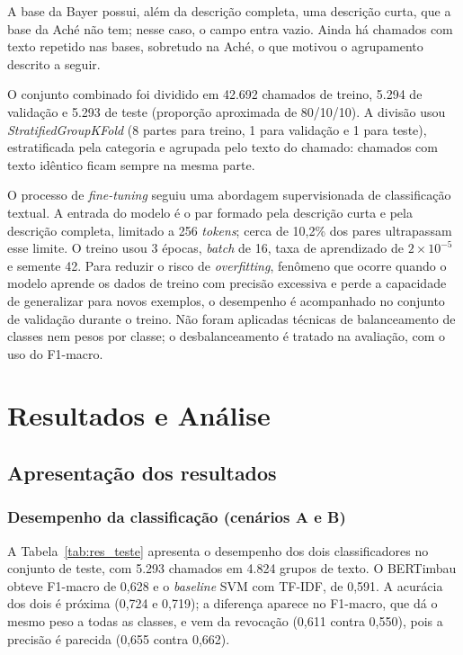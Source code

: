 \documentclass[
    12pt,                %
    openright,           %
    oneside,             %
    a4paper,             %
    english,             %
    brazil               %
]{abntex2}
\begin{document}
A base da Bayer possui, além da descrição completa, uma descrição curta, que a base da Aché não tem; nesse caso, o campo entra vazio. Ainda há chamados com texto repetido nas bases, sobretudo na Aché, o que motivou o agrupamento descrito a seguir.

O conjunto combinado foi dividido em 42.692 chamados de treino, 5.294 de validação e 5.293 de teste (proporção aproximada de 80/10/10). A divisão usou \textit{StratifiedGroupKFold} (8 partes para treino, 1 para validação e 1 para teste), estratificada pela categoria e agrupada pelo texto do chamado: chamados com texto idêntico ficam sempre na mesma parte.

O processo de \textit{fine-tuning} seguiu uma abordagem supervisionada de classificação textual. A entrada do modelo é o par formado pela descrição curta e pela descrição completa, limitado a 256 \textit{tokens}; cerca de 10,2\% dos pares ultrapassam esse limite. O treino usou 3 épocas, \textit{batch} de 16, taxa de aprendizado de $2 \times 10^{-5}$ e semente 42. Para reduzir o risco de \textit{overfitting}, fenômeno que ocorre quando o modelo aprende os dados de treino com precisão excessiva e perde a capacidade de generalizar para novos exemplos, o desempenho é acompanhado no conjunto de validação durante o treino. Não foram aplicadas técnicas de balanceamento de classes nem pesos por classe; o desbalanceamento é tratado na avaliação, com o uso do F1-macro.

\chapter{Resultados e Análise}
\label{cap:resultados}

\section{Apresentação dos resultados}

\subsection{Desempenho da classificação (cenários A e B)}
\label{subsec:res_classificacao}

A Tabela~\ref{tab:res_teste} apresenta o desempenho dos dois classificadores no conjunto de teste, com 5.293 chamados em 4.824 grupos de texto. O BERTimbau obteve F1-macro de 0,628 e o \textit{baseline} SVM com TF-IDF, de 0,591. A acurácia dos dois é próxima (0,724 e 0,719); a diferença aparece no F1-macro, que dá o mesmo peso a todas as classes, e vem da revocação (0,611 contra 0,550), pois a precisão é parecida (0,655 contra 0,662).
\end{document}
